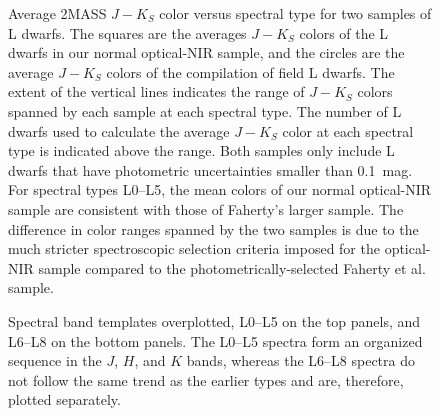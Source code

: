 \documentclass[12pt,preprint]{aastex}
\begin{document}

\begin{figure}
		\caption{Average 2MASS $J-K_S$ color versus spectral type for two samples of L dwarfs. The squares are the averages $J-K_S$ colors of the L dwarfs in our normal optical-NIR sample, and the circles are the average $J-K_S$ colors of the \citet{Faherty13_0355} compilation of field L dwarfs. The extent of the vertical lines indicates the range of $J-K_S$ colors spanned by each sample at each spectral type. The number of L dwarfs used to calculate the average $J-K_S$ color at each spectral type is indicated above the range. Both samples only include L dwarfs that have photometric uncertainties smaller than 0.1~mag. For spectral types L0--L5, the mean colors of our normal optical-NIR sample are consistent with those of Faherty's larger sample. The difference in color ranges spanned by the two samples is due to the much stricter spectroscopic selection criteria imposed for the optical-NIR sample compared to the photometrically-selected Faherty et al. sample. 
}
	\label{fig:JK_colors_F13}
\end{figure}

\begin{figure}
	\caption{Spectral band templates overplotted, L0--L5 on the top panels, and L6--L8 on the bottom panels. %
	The L0--L5 spectra form an organized sequence in the $J$, $H$, and $K$ bands, whereas the L6--L8 spectra do not follow the same trend as the earlier types and are, therefore, plotted separately.}
	\label{fig:spec_sequence}
\end{figure}




\end{document}
